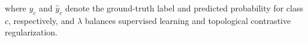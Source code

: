 where $y_c$ and $\hat{y}_c$ denote the ground-truth label and predicted probability for class $c$, respectively, and $\lambda$ balances supervised learning and topological contrastive regularization.




